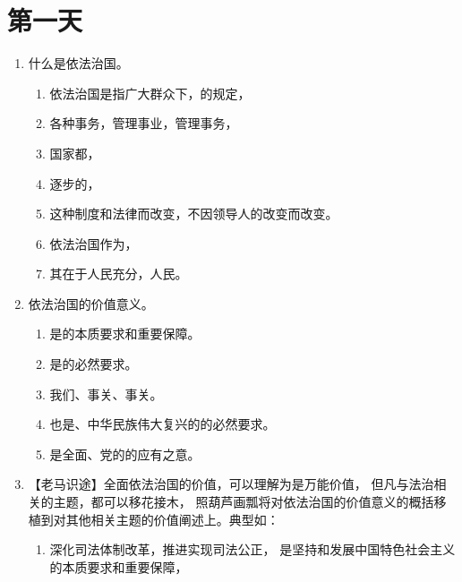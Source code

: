 \section{第一天}
\begin{enumerate}
  \item 什么是依法治国。
        \begin{enumerate}
          \item 依法治国是指广大群众下，的规定，
          \item {}各种事务，管理事业，管理事务，
          \item {}国家都，
          \item 逐步的，
          \item {}这种制度和法律而改变，不因领导人的改变而改变。
          \item 依法治国作为，
          \item 其在于人民充分，人民。
        \end{enumerate}
  \item 依法治国的价值意义。
        \begin{enumerate}
          \item \blh 是的本质要求和重要保障。
          \item \blh 是的必然要求。
          \item \blh {}我们、事关、事关。
          \item \blh 也是、中华民族伟大复兴的的必然要求。
          \item \blh 是全面、党的的应有之意。
        \end{enumerate}
  \item 【老马识途】全面依法治国的价值，可以理解为是万能价值，
        但凡与法治相关的主题，都可以移花接木，
        照葫芦画瓢将对依法治国的价值意义的概括移植到对其他相关主题的价值阐述上。典型如：
        \begin{enumerate}
          \item 深化司法体制改革，推进实现司法公正，
                是坚持和发展中国特色社会主义的本质要求和重要保障，

\end{enumerate}
\end{enumerate}
